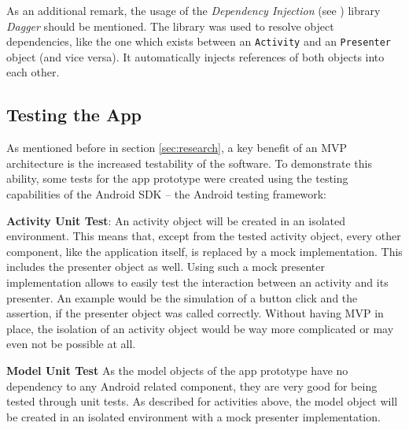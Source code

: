 As an additional remark, the usage of the \emph{Dependency Injection} (see \cite{FowlerIoC}) library \emph{Dagger} should be mentioned. The library was used to resolve object dependencies, like the one which exists between an \texttt{Activity} and an \texttt{Presenter} object (and vice versa). It automatically injects references of both objects into each other.

\subsection{Testing the App}

As mentioned before in section \ref{sec:research}, a key benefit of an MVP architecture is the increased testability of the software.
To demonstrate this ability, some tests for the app prototype were created using the testing capabilities of the Android SDK -- the Android testing framework:

\textbf{Activity Unit Test}:
An activity object will be created in an isolated environment. This means that, except from the tested activity object, every other component, like the application itself, is replaced by a mock implementation. This includes the presenter object as well. Using such a mock presenter implementation allows to easily test the interaction between an activity and its presenter.
An example would be the simulation of a button click and the assertion, if the presenter object was called correctly.
Without having MVP in place, the isolation of an activity object would be way more complicated or may even not be possible at all.

\textbf{Model Unit Test}
As the model objects of the app prototype have no dependency to any Android related component, they are very good for being tested through unit tests. As described for activities above, the model object will be created in an isolated environment with a mock presenter implementation.
